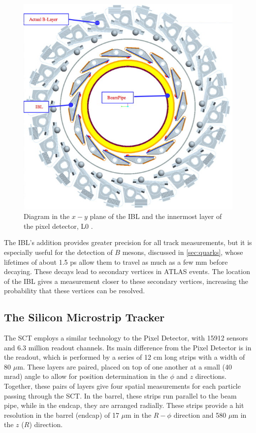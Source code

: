 \begin{centering}
\begin{figure}[bth]
\myfloatalign
\includegraphics[width=.90\linewidth]{figures/atlas/IBL-other.png}
\caption{Diagram in the $x-y$ plane of the \ac{IBL} and the innermost layer of the pixel detector, L0 \cite{1201.5469}.}
\label{fig:ibl_add}
\end{figure}
\end{centering}

The \ac{IBL}'s addition provides greater precision for all track measurements, but it is especially useful for the detection of $B$ mesons, discussed in \autoref{sec:quarks}, whose lifetimes of about 1.5 ps allow them to travel as much as a few mm before decaying. These decays lead to secondary vertices in \ac{ATLAS} events. The location of the \ac{IBL} gives a measurement closer to these secondary vertices, increasing the probability that these vertices can be resolved. 

\subsection{The Silicon Microstrip Tracker}

The \ac{SCT} employs a similar technology to the Pixel Detector, with 15912 sensors and 6.3 million readout channels. Its main difference from the Pixel Detector is in the readout, which is performed by a series of 12 cm long strips with a width of 80 $\mu$m. These layers are paired, placed on top of one another at a small (40 mrad) angle to allow for position determination in the $\phi$ and $z$ directions. Together, these pairs of layers give four spatial measurements for each particle passing through the \ac{SCT}. In the barrel, these strips run parallel to the beam pipe, while in the endcap, they are arranged radially. These strips provide a hit resolution in the barrel (endcap) of 17 $\mu$m in the $R-\phi$ direction and 580 $\mu$m in the $z$ ($R$) direction. 

